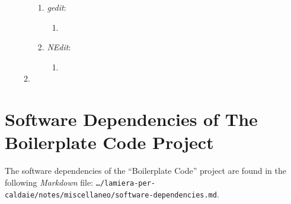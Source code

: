 \begin{enumerate}
\begin{enumerate}
		\begin{enumerate} \itemsep -2pt
		\item {\it gedit}: \vspace{-0.1cm}
			\begin{enumerate} \itemsep -1pt
			\item 
			\end{enumerate}
		\item {\it NEdit}: \vspace{-0.1cm}
			\begin{enumerate} \itemsep -1pt
			\item 
			\end{enumerate}
		\end{enumerate}
	\item 
	\end{enumerate}
\end{enumerate}








\section{Software Dependencies of The Boilerplate Code Project}
\label{sec:SoftwareDependenciesOfTheBoilerplateCodeProject}


The software dependencies of the ``Boilerplate Code'' project are found in the following {\it Markdown} file: {\tt \dots/lamiera-per-caldaie/notes/miscellaneo/software-dependencies.md}.








